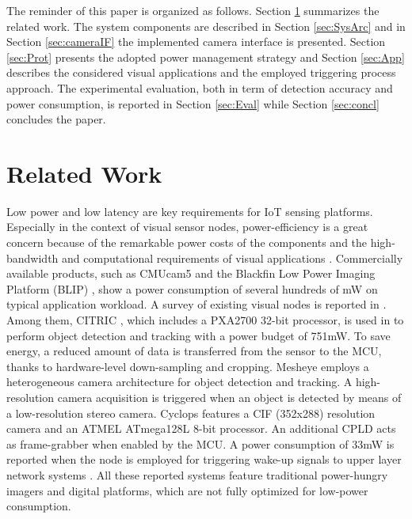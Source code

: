 \documentclass[journal]{IEEEtran}
\begin{document}
The reminder of this paper is organized as follows. Section \ref{sec:RelWork} summarizes the related work. The system components are described in Section \ref{sec:SysArc} and in Section \ref{sec:cameraIF} the implemented camera interface is presented. Section \ref{sec:Prot} presents the adopted power management strategy and Section \ref{sec:App} describes the considered visual applications and the employed triggering process approach. The experimental evaluation, both in term of detection accuracy and power consumption, is reported in Section \ref{sec:Eval} while Section \ref{sec:concl} concludes the paper.



\section{Related Work}
\label{sec:RelWork}

Low power and low latency are key requirements for IoT sensing platforms\cite{Chen2014}. 
Especially in the context of visual sensor nodes, power-efficiency is a great concern because of the remarkable power costs of the components and the high-bandwidth and computational requirements of visual applications \cite{Abas2014}. Commercially available products, such as CMUcam5 \cite{CMUCAM} and the Blackfin Low Power Imaging Platform (BLIP) \cite{BLIP}, show a power consumption of several hundreds of mW on typical application workload. A survey of existing visual nodes is reported in \cite{Tavli2012}.
Among them, CITRIC \cite{Chen2013}, which includes a PXA2700 32-bit processor, is used in \cite{Casares2011} to perform object detection and tracking with a power budget of 751mW. To save energy, a reduced amount of data is transferred from the sensor to the MCU, thanks to hardware-level down-sampling and cropping.
Mesheye \cite{Hengstler2007} employs a heterogeneous camera architecture for object detection and tracking. A high-resolution camera acquisition is triggered when an object is detected by means of a low-resolution stereo camera.
Cyclops \cite{Rahimi2005} features a CIF (352x288) resolution camera and an ATMEL ATmega128L 8-bit processor. An additional CPLD acts as frame-grabber when enabled by the MCU. A power consumption of 33mW is reported when the node is employed for triggering wake-up signals to upper layer network systems \cite{Kulkarni2005}.
All these reported systems feature traditional power-hungry imagers and digital platforms, which are not fully optimized for low-power consumption. 
\end{document}
